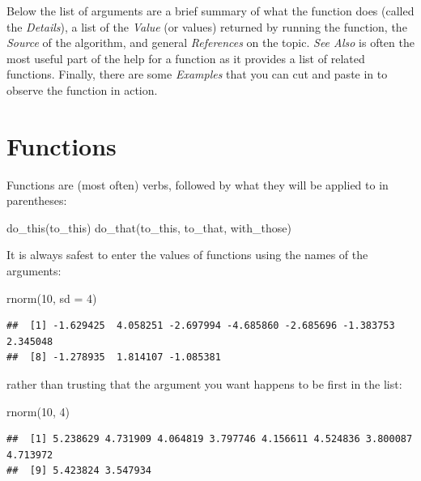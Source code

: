 \documentclass[
]{book}
\newenvironment{Shaded}{\begin{snugshade}}{\end{snugshade}}
\newcommand{\AttributeTok}[1]{\textcolor[rgb]{0.77,0.63,0.00}{#1}}
\newcommand{\DecValTok}[1]{\textcolor[rgb]{0.00,0.00,0.81}{#1}}
\newcommand{\FunctionTok}[1]{\textcolor[rgb]{0.00,0.00,0.00}{#1}}
\newcommand{\NormalTok}[1]{#1}
\begin{document}
Below the list of arguments are a brief summary of what the function does (called the \emph{Details}), a list of the \emph{Value} (or values) returned by running the function, the \emph{Source} of the algorithm, and general \emph{References} on the topic. \emph{See Also} is often the most useful part of the help for a function as it provides a list of related functions. Finally, there are some \emph{Examples} that you can cut and paste in to observe the function in action.

\hypertarget{functions}{%
\section{Functions}\label{functions}}

Functions are (most often) verbs, followed by what they will be applied to in parentheses:

\begin{Shaded}
\begin{Highlighting}[]
\FunctionTok{do\_this}\NormalTok{(to\_this)}
\FunctionTok{do\_that}\NormalTok{(to\_this, to\_that, with\_those)}
\end{Highlighting}
\end{Shaded}

It is always safest to enter the values of functions using the names of the arguments:

\begin{Shaded}
\begin{Highlighting}[]
\FunctionTok{rnorm}\NormalTok{(}\DecValTok{10}\NormalTok{, }\AttributeTok{sd =} \DecValTok{4}\NormalTok{)}
\end{Highlighting}
\end{Shaded}

\begin{verbatim}
##  [1] -1.629425  4.058251 -2.697994 -4.685860 -2.685696 -1.383753  2.345048
##  [8] -1.278935  1.814107 -1.085381
\end{verbatim}

rather than trusting that the argument you want happens to be first in the list:

\begin{Shaded}
\begin{Highlighting}[]
\FunctionTok{rnorm}\NormalTok{(}\DecValTok{10}\NormalTok{, }\DecValTok{4}\NormalTok{)}
\end{Highlighting}
\end{Shaded}

\begin{verbatim}
##  [1] 5.238629 4.731909 4.064819 3.797746 4.156611 4.524836 3.800087 4.713972
##  [9] 5.423824 3.547934
\end{verbatim}
\end{document}
